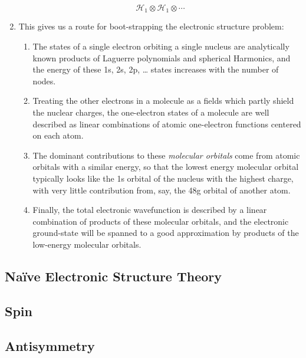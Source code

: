 \begin{enumerate}
\begin{equation}
            \mathcal{H}_1
            \otimes
            \mathcal{H}_1
            \otimes
            \cdots
        \end{equation}
    \item
        This gives us a route for boot-strapping the electronic structure
        problem:
        \begin{enumerate}
            \item
                The states of a single electron orbiting a single nucleus are
                analytically known products of Laguerre polynomials and
                spherical Harmonics, and the energy of these 1s, 2s, 2p, \dots
                states increases with the number of nodes.
            \item
                Treating the other electrons in a molecule as a fields which
                partly shield the nuclear charges, the one-electron states of a
                molecule are well described as linear combinations of atomic
                one-electron functions centered on each atom.
            \item
                The dominant contributions to these {\itshape molecular
                orbitals} come from atomic orbitals with a similar energy, so
                that the lowest energy molecular orbital typically looks like
                the 1s orbital of the nucleus with the highest charge, with very
                little contribution from, say, the 48g orbital of another atom.
            \item
                Finally, the total electronic wavefunction is described by a
                linear combination of products of these molecular orbitals, and
                the electronic ground-state will be spanned to a good
                approximation by products of the low-energy molecular orbitals.
        \end{enumerate}
\end{enumerate}


\subsection{Na\"ive Electronic Structure Theory}

\subsection{Spin}

\subsection{Antisymmetry}

